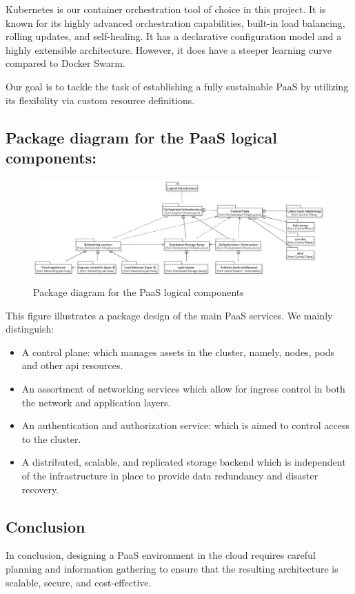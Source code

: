Kubernetes is our container orchestration tool of choice in this project. It is known for its highly advanced orchestration capabilities, built-in load balancing, rolling updates, and self-healing. It has a declarative configuration model and a highly extensible architecture. However, it does have a steeper learning curve compared to Docker Swarm.  

Our goal is to tackle the task of establishing a fully sustainable PaaS by utilizing its flexibility via custom resource definitions. 


\subsection{Package diagram for the PaaS logical components:}

\begin{figure}[H]\centering
\includegraphics[width=1.0\textwidth,angle=00]{assets/f12.jpg}
\caption{Package diagram for the PaaS logical components}
\label{fig:Package diagram for the PaaS logical components}
\end{figure}

This figure illustrates a package design of the main PaaS services. We mainly distinguish: 
\begin{itemize}[label={--}]
\item  A control plane: which manages assets in the cluster, namely, nodes, pods and other api resources. 
\item An assortment of networking services which allow for ingress control in both the network and application layers. 
\item An authentication and authorization service: which is aimed to control access to the cluster. 
\item A distributed, scalable, and replicated storage backend which is independent of the infrastructure in place to provide data redundancy and disaster recovery. 
\end{itemize}

\subsection*{Conclusion}
In conclusion, designing a PaaS environment in the cloud requires careful planning and information gathering to ensure that the resulting architecture is scalable, secure, and cost-effective. 

